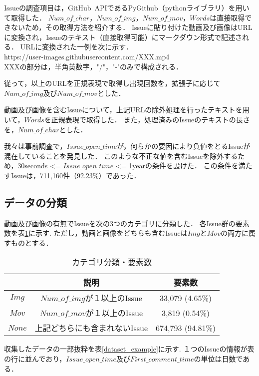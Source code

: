 Issueの調査項目は，GitHub~APIであるPyGithub（pythonライブラリ）を用いて取得した．
$Num\_of\_char$，$Num\_of\_img$，$Num\_of\_mov$，$Words$は直接取得できないため，その取得方法を紹介する．
Issueに貼り付けた動画及び画像はURLに変換され，Issueのテキスト（直接取得可能）にマークダウン形式で記述される．
URLに変換された一例を次に示す．\\

https://user-images.githubusercontent.com/XXX.mp4 \\

XXXの部分は，半角英数字，"/"，"-"のみで構成される．

従って，以上のURLを正規表現で取得し出現回数を，拡張子に応じて$Num\_of\_img$及び$Num\_of\_mov$とした．

動画及び画像を含むIssueについて，上記URLの除外処理を行ったテキストを用いて，$Words$を正規表現で取得した．
また，処理済みのIssueのテキストの長さを，$Num\_of\_char$とした．


我々は事前調査で，$Issue\_open\_time$が，何らかの要因により負値をとるIssueが混在していることを発見した．
このような不正な値を含むIssueを除外するため，30seconds <= $Issue\_open\_time$ <= 1yearの条件を設けた．
この条件を満たすIssueは，711,160件（92.23\%）であった．


\subsection{データの分類}
動画及び画像の有無でIssueを次の3つのカテゴリに分類した．
各Issue群の要素数を表\ref{classify_result}に示す. 
ただし，動画と画像をどちらも含むIssueは$Img$と$Mov$の両方に属すものとする．
\begin{table}[h]
    \begin{center}
    \caption{カテゴリ分類・要素数}
    \begin{tabular}{c|c|c}
        \hline
         & 説明 & 要素数 \\
         \hline
        $Img$  & $Num\_of\_img$が１以上のIssue & 33,079 (4.65\%)\\
        $Mov$  & $Num\_of\_mov$が１以上のIssue & 3,819 (0.54\%)\\
        $None$ & 上記どちらにも含まれないIssue & 674,793 (94.81\%)\\ 
        \hline
    \end{tabular}
    \label{classify_result}
    \end{center}
\end{table}

収集したデータの一部抜粋を表\ref{dataset_example}に示す.
１つのIssueの情報が表の行に並んでおり，$Issue\_open\_time$及び$First\_comment\_time$の単位は日数である．


